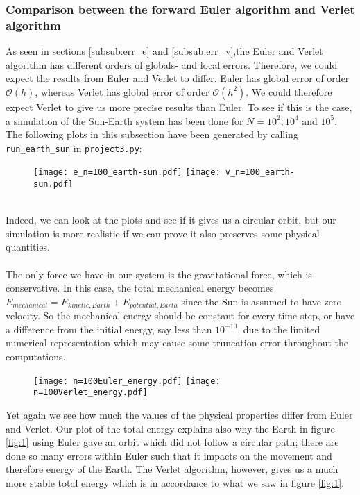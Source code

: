 \documentclass[12pt]{article}
\begin{document}
	\subsubsection{Comparison between the forward Euler algorithm and Verlet algorithm}\label{subsub:comparison}
	As seen in sections \ref{subsub:err_e} and \ref{subsub:err_v},the Euler and Verlet algorithm has different orders of globals- and local errors. Therefore, we could expect the results from Euler and Verlet to differ. Euler has global error of order $\mathcal{O}(h)$, whereas Verlet has global error of order $\mathcal{O}(h^2)$. We could therefore expect Verlet to give us more precise results than Euler. To see if this is the case, a simulation of the Sun-Earth system has been done for $N = 10^2,10^4 \text{ and } 10^5$. \\
	The following plots in this subsection have been generated by calling \texttt{run\_earth\_sun} in \texttt{project3.py}:\\
	\begin{figure}[h]
		\texttt{[image: e\_n=100\_earth-sun.pdf]}
		\texttt{[image: v\_n=100\_earth-sun.pdf]}
	\end{figure}
			\label{fig:1}\hfill \\
	Indeed, we can look at the plots and see if it gives us a circular orbit, but our simulation is more realistic if we can prove it also preserves some physical quantities. \\ \\The only force we have in our system is the gravitational force, which is conservative. In this case, the total mechanical energy becomes $E_{mechanical} = E_{kinetic,Earth} + E_{potential,Earth}$ since the Sun is assumed to have zero velocity. So the mechanical energy should be constant for every time step, or have a difference from the initial energy, say less than $10^{-10}$, due to the limited numerical representation which may cause some truncation error throughout the computations.
	\begin{figure}[h]
		\texttt{[image: n=100Euler\_energy.pdf]}
		\texttt{[image: n=100Verlet\_energy.pdf]}
	\end{figure}
	 {Yet again we see how much the values of the physical properties differ from Euler and Verlet. Our plot of the total energy explains also why the Earth in figure \ref{fig:1} using Euler gave an orbit which did not follow a circular path; there are done so many errors within Euler such that it impacts on the movement and therefore energy of the Earth. The Verlet algorithm, however, gives us a much more stable total energy which is in accordance to what we saw in figure \ref{fig:1}. }\label{fig:2} \hfill \\
\end{document}
